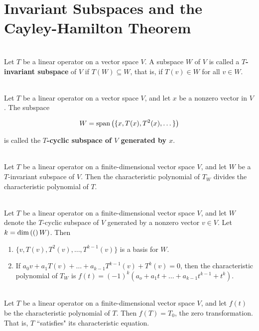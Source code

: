 \section{Invariant Subspaces and the Cayley-Hamilton Theorem}

\begin{definition}
	\hfill\\
	Let $T$ be a linear operator on a vector space $V$. A subspace $W$ of $V$ is called a \textbf{$T$-invariant subspace} of $V$ if $T(W) \subseteq W$, that is, if $T(v) \in W$ for all $v \in W$.
\end{definition}

\begin{definition}
	\hfill\\
	Let $T$ be a linear operator on a vector space $V$, and let $x$ be a nonzero vector in $V$. The subspace

	\[W = \text{span}\left(\{x, T(x), T^2(x), \dots\}\right)\]

	is called the \textbf{$T$-cyclic subspace of $V$ generated by $x$}.
\end{definition}

\begin{theorem}
	\hfill\\
	Let $T$ be a linear operator on a finite-dimensional vector space $V$, and let $W$ be a $T$-invariant subspace of $V$. Then the characteristic polynomial of $T_W$ divides the characteristic polynomial of $T$.
\end{theorem}

\begin{theorem}\label{Theorem 5.22}
	\hfill\\
	Let $T$ be a linear operator on a finite-dimensional vector space $V$, and let $W$ denote the $T$-cyclic subspace of $V$ generated by a nonzero vector $v \in V$. Let $k = \text{dim}\left((\right)W)$. Then

	\begin{enumerate}
		\item $\{v, T(v), T^2(v), \dots, T^{k-1}(v)\}$ is a basis for $W$.
		\item If $a_0v + a_1T(v) + \dots + a_{k-1}T^{k-1}(v)+T^k(v) = 0$, then the characteristic polynomial of $T_W$ is $f(t) = (-1)^k(a_o + a_1t + \dots +a_{k-1}t^{k-1}+t^k)$.
	\end{enumerate}
\end{theorem}

\begin{theorem}
	\hfill\\
	Let $T$ be a linear operator on a finite-dimensional vector space $V$, and let $f(t)$ be the characteristic polynomial of $T$. Then $f(T) = T_0$, the zero transformation. That is, $T$ ``satisfies" its characteristic equation.
\end{theorem}


